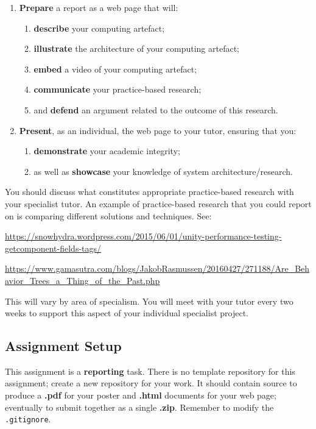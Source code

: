 \documentclass{../../fal_assignment}
\begin{document}
\begin{enumerate}[label=(\Alph*)]
\begin{enumerate}[label=(\roman*)]
		\end{enumerate}
	\item \textbf{Prepare} a report as a web page that will:
		\begin{enumerate}[label=(\roman*)]
			\item \textbf{describe} your computing artefact;
			\item \textbf{illustrate} the architecture of your computing artefact;
			\item \textbf{embed} a video of your computing artefact;
			\item \textbf{communicate} your practice-based research;
			\item and \textbf{defend} an argument related to the outcome of this research.
		\end{enumerate}		
	\item \textbf{Present}, as an individual, the web page to your tutor, ensuring that you:
		\begin{enumerate}[label=(\roman*)]
			\item \textbf{demonstrate} your academic integrity;
			\item as well as \textbf{showcase} your knowledge of system architecture/research.
		\end{enumerate}			
\end{enumerate}

You should discuss what constitutes appropriate practice-based research with your specialist tutor. An example of practice-based research that you could report on is comparing different solutions and techniques. See:

\url{https://snowhydra.wordpress.com/2015/06/01/unity-performance-testing-getcomponent-fields-tags/} 

\url{https://www.gamasutra.com/blogs/JakobRasmussen/20160427/271188/Are_Behavior_Trees_a_Thing_of_the_Past.php} 

This will vary by area of specialism. You will meet with your tutor every two weeks to support this aspect of your individual specialist project.

\subsection*{Assignment Setup}

This assignment is a \textbf{reporting} task. There is no template repository for this assignment; create a new repository for your work. It should contain source to produce a \textbf{.pdf} for your poster and \textbf{.html} documents for your web page; eventually to submit together as a single \textbf{.zip}.
Remember to modify the \texttt{.gitignore}.
\end{document}
